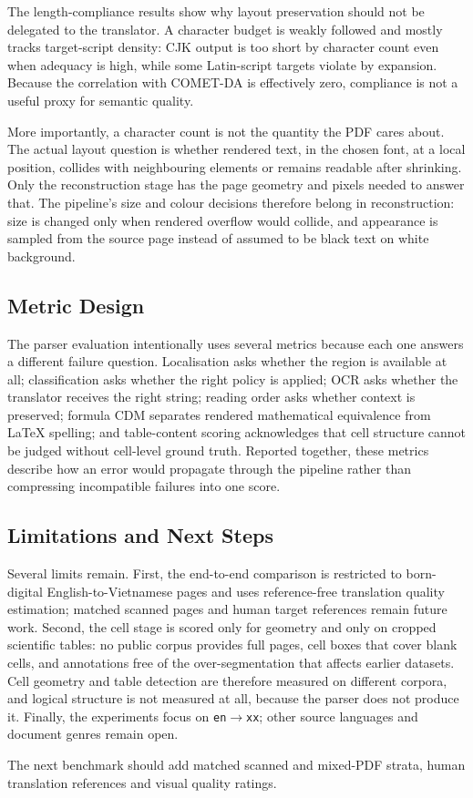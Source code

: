The length-compliance results show why layout preservation should not be
delegated to the translator. A character budget is weakly followed and mostly
tracks target-script density: CJK output is too short by character count even
when adequacy is high, while some Latin-script targets violate by expansion.
Because the correlation with COMET-DA is effectively zero, compliance is not a
useful proxy for semantic quality.

More importantly, a character count is not the quantity the PDF cares about. The
actual layout question is whether rendered text, in the chosen font, at a local
position, collides with neighbouring elements or remains readable after
shrinking. Only the reconstruction stage has the page geometry and pixels needed
to answer that. The pipeline's size and colour decisions therefore belong in
reconstruction: size is changed only when rendered overflow would collide, and
appearance is sampled from the source page instead of assumed to be black text on
white background.

\subsection{Metric Design}
\label{subsec:disc-metrics}

The parser evaluation intentionally uses several metrics because each one
answers a different failure question. Localisation asks whether the region is
available at all; classification asks whether the right policy is applied; OCR
asks whether the translator receives the right string; reading order asks
whether context is preserved; formula CDM separates rendered mathematical
equivalence from LaTeX spelling; and table-content scoring acknowledges that
cell structure cannot be judged without cell-level ground truth. Reported
together, these metrics describe how an error would propagate through the
pipeline rather than compressing incompatible failures into one score.

\subsection{Limitations and Next Steps}
\label{subsec:disc-limitations}

Several limits remain. First, the end-to-end comparison is restricted to
born-digital English-to-Vietnamese pages and uses reference-free translation
quality estimation; matched scanned pages and human target references remain
future work. Second, the cell stage is scored only for geometry and only on cropped
scientific tables: no public corpus provides full pages, cell boxes that cover blank
cells, and annotations free of the over-segmentation that affects earlier datasets. Cell
geometry and table detection are therefore measured on different corpora, and logical
structure is not measured at all, because the parser does not produce it. Finally,
the experiments focus on \texttt{en}$\rightarrow$\texttt{xx}; other source
languages and document genres remain open.

The next benchmark should add matched scanned and mixed-PDF strata, human
translation references and visual quality ratings.
